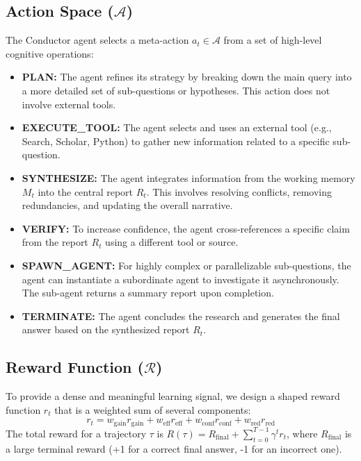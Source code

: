 \documentclass{article}
\begin{document}
\subsection{Action Space ($\mathcal{A}$)}
The Conductor agent selects a meta-action $a_t \in \mathcal{A}$ from a set of high-level cognitive operations:
\begin{itemize}
    \item \textbf{PLAN:} The agent refines its strategy by breaking down the main query into a more detailed set of sub-questions or hypotheses. This action does not involve external tools.
    \item \textbf{EXECUTE\_TOOL:} The agent selects and uses an external tool (e.g., Search, Scholar, Python) to gather new information related to a specific sub-question.
    \item \textbf{SYNTHESIZE:} The agent integrates information from the working memory $M_t$ into the central report $R_t$. This involves resolving conflicts, removing redundancies, and updating the overall narrative.
    \item \textbf{VERIFY:} To increase confidence, the agent cross-references a specific claim from the report $R_t$ using a different tool or source.
    \item \textbf{SPAWN\_AGENT:} For highly complex or parallelizable sub-questions, the agent can instantiate a subordinate agent to investigate it asynchronously. The sub-agent returns a summary report upon completion.
    \item \textbf{TERMINATE:} The agent concludes the research and generates the final answer based on the synthesized report $R_t$.
\end{itemize}

\subsection{Reward Function ($\mathcal{R}$)}
To provide a dense and meaningful learning signal, we design a shaped reward function $r_t$ that is a weighted sum of several components:
\begin{equation}
    r_t = w_{\text{gain}}r_{\text{gain}} + w_{\text{eff}}r_{\text{eff}} + w_{\text{conf}}r_{\text{conf}} + w_{\text{red}}r_{\text{red}}
\end{equation}
The total reward for a trajectory $\tau$ is $R(\tau) = R_{\text{final}} + \sum_{t=0}^{T-1} \gamma^t r_t$, where $R_{\text{final}}$ is a large terminal reward (+1 for a correct final answer, -1 for an incorrect one).
\end{document}
